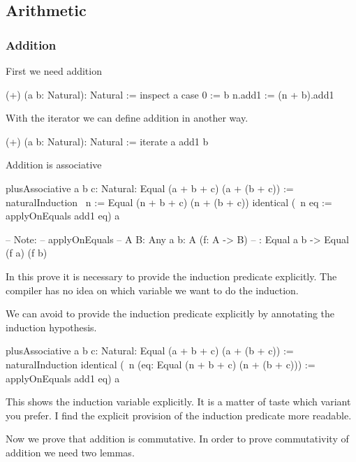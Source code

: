 \vskip 5mm
\subsection{Arithmetic}

\subsubsection{Addition}


First we need addition
\begin{alba}
  (+) (a b: Natural): Natural :=
    inspect a case
      0 :=
        b
      n.add1 :=
        (n + b).add1
\end{alba}

With the iterator we can define addition in another way.

\begin{alba}
    (+) (a b: Natural): Natural :=
        iterate a add1 b
\end{alba}


Addition is associative
%
\begin{alba}
    plusAssociative {a b c: Natural}: Equal (a + b + c) (a + (b + c)) :=
        naturalInduction
            {\ n := Equal (n + b + c) (n + (b + c))}
            identical
            (\ {n} eq := applyOnEquals add1 eq)
            {a}

    -- Note:
    -- applyOnEquals
    --      {A B: Any} {a b: A} (f: A -> B)
    --      : Equal a b -> Equal (f a) (f b)
\end{alba}

In this prove it is necessary to provide the induction predicate explicitly. The
compiler has no idea on which variable we want to do the induction.

We can avoid to provide the induction predicate explicitly by annotating the
induction hypothesis.

\begin{alba}
    plusAssociative {a b c: Natural}: Equal (a + b + c) (a + (b + c)) :=
        naturalInduction
            identical
            (\ {n} (eq: Equal (n + b + c) (n + (b + c))) :=
                applyOnEquals add1 eq)
            {a}
\end{alba}
%
This shows the induction variable explicitly. It is a matter of taste which
variant you prefer. I find the explicit provision of the induction predicate
more readable.


Now we prove that addition is commutative. In order to prove commutativity of
addition we need two lemmas.

